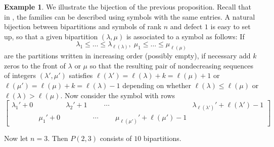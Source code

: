\documentclass{amsart}
\numberwithin{equation}{section}
\theoremstyle{definition}
\newtheorem{example}[lemma]{Example}%
\begin{document}
\begin{example}
    We illustrate the bijection of the previous proposition. Recall that in \cite{LusztigBook}, the families can be described using symbols with the same entries.
    A natural bijection between bipartitions and symbols of rank $n$ and defect $1$ is easy to set up, so that a given bipartition $(\lambda,\mu)$ is associated to a symbol as follows:
    If $$\lambda_1\leq\ldots\leq \lambda_{\ell(\lambda)},\;\mu_1\leq\ldots\leq\mu_{\ell(\mu)}$$ are the partitions written in increasing order (possibly empty), if necessary add $k$ zeros to the front of $\lambda$ or $\mu$ so that the resulting pair of nondecreasing sequences of integers $(\lambda',\mu')$ satisfies $\ell(\lambda')=\ell(\lambda)+k=\ell(\mu)+1$ or
    $\ell(\mu')=\ell(\mu)+k=\ell(\lambda)-1$
 depending on whether $\ell(\lambda)\leq \ell(\mu)$ or $\ell(\lambda)>\ell(\mu)$. Now consider the symbol with rows $$
    \begin{bmatrix}
        \lambda_1'+0&&\lambda_2'+1&&\cdots&&\lambda_{\ell(\lambda')}'+\ell(\lambda')-1\\
        &\mu_1'+0&&\cdots&&\mu_{\ell(\mu')}'+\ell(\mu')-1&
    \end{bmatrix}$$
    
    Now let $n=3$. Then $P(2,3)$ consists of $10$ bipartitions. 


\end{example}
\end{document}
